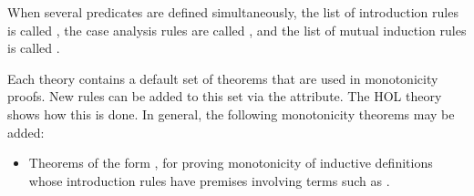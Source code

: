 \begin{isabellebody}
\begin{isamarkuptext}
  When several predicates  are
  defined simultaneously, the list of introduction rules is called
  , the case analysis rules are
  called , and the list
  of mutual induction rules is called .%
\end{isamarkuptext}%
\isamarkuptrue%
%
\isamarkuptrue%
%
\begin{isamarkuptext}%
Each theory contains a default set of theorems that are used in
  monotonicity proofs.  New rules can be added to this set via the
  \hyperlink{attribute.HOL.mono}{\mbox{}} attribute.  The HOL theory 
  shows how this is done.  In general, the following monotonicity
  theorems may be added:

  \begin{itemize}

  \item Theorems of the form , for proving
  monotonicity of inductive definitions whose introduction rules have
  premises involving terms such as .


\end{itemize}
\end{isamarkuptext}
\end{isabellebody}
